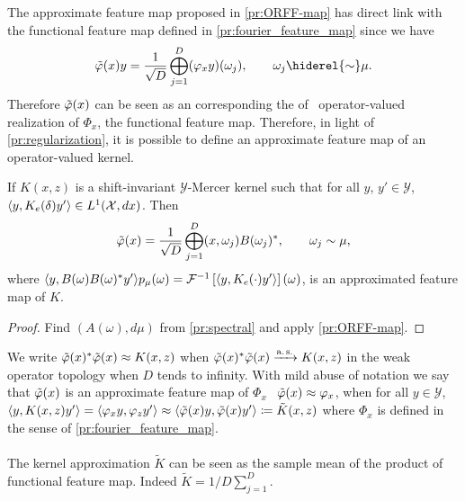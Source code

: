 The approximate feature map proposed in \cref{pr:ORFF-map} has direct link with the functional feature map defined in \cref{pr:fourier_feature_map} since we have
\begin{dmath}
\tildePhi(x)y = \frac{1}{\sqrt{D}} \Vect_{j=1}^D (\Phi_x y)(\omega_j), \qquad \omega_j \hiderel{\sim} \mu.
\end{dmath}
Therefore $\tildePhi(x)$ can be seen as an  corresponding the  of \iid~operator-valued realization of $\Phi_x$, the functional feature map. Therefore, in light of \cref{pr:regularization}, it is possible to define an approximate feature map of an operator-valued kernel.


\begin{corollary}
\label{cr:ORFF-map-kernel}
If $K(x,z)$ is a shift-invariant $\mathcal{Y}$-Mercer kernel such that for all $y$, $y'\in\mathcal{Y}$, $\langle y, K_e(\delta)y'\rangle\in L^1(\mathcal{X},dx)$. Then
\begin{equation}
\tildePhi(x)= \frac{1}{\sqrt{D}}\Vect_{j=1}^D\pairing{x, \omega_j}B(\omega_j)^*, \qquad \omega_j \sim \mu,
\end{equation}
where $\langle y, B(\omega)B(\omega)^*y'\rangle p_{\mu}(\omega)=\mathcal{F}^{-1}\left[\langle y, K_e(\cdot)y'\rangle\right](\omega)$, is an approximated feature map of $K$.
\end{corollary}
\begin{proof}
Find $(A(\omega), d\mu)$ from \cref{pr:spectral} and apply \cref{pr:ORFF-map}.
\end{proof}

We write $\tildePhi(x)^*\tildePhi(x)\approx K(x,z)$ when $\tildePhi(x)^*\tildePhi(x)\converges{\asurely}{} K(x,z)$ in the weak operator topology when $D$ tends to infinity. With mild abuse of notation we say that $\tildePhi(x)$ is an approximate feature map of $\Phi_x$ \ie~$\tildePhi(x)\approx \Phi_x$, when for all $y\in\mathcal{Y}$, $\inner{y, K(x,z)y'}=\inner{\Phi_x y, \Phi_z y'}\approx \inner{\tildePhi(x)y, \tildePhi(x)y'}\coloneqq \tilde{K}(x,z)$ where $\Phi_x$ is defined in the sense of \cref{pr:fourier_feature_map}. 
\paragraph{}
The kernel approximation $\tilde{K}$ can be seen as the sample mean of the product of functional feature map. Indeed $\tilde{K}=1/D \sum_{j=1}^{D}$.

